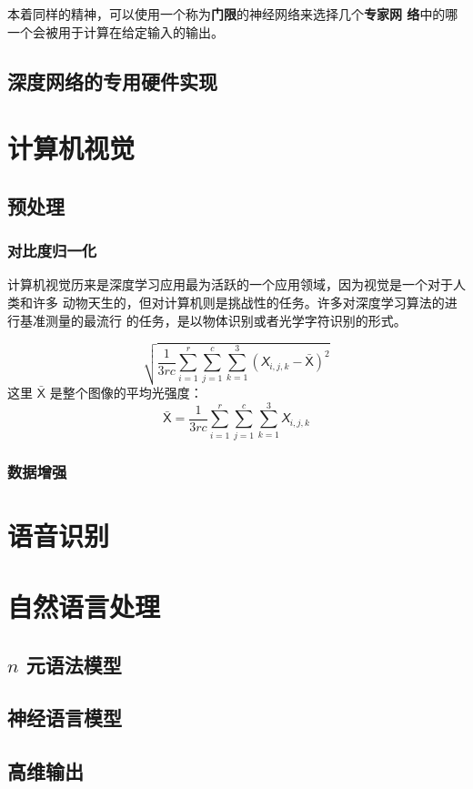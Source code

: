 本着同样的精神，可以使用一个称为\textbf{门限}的神经网络来选择几个\textbf{专家网
  络}中的哪一个会被用于计算在给定输入的输出。

\subsection{深度网络的专用硬件实现}
\label{subsec:specialized_hardware_implementations_of_deep_networks}

\section{计算机视觉}
\label{sec:computer_vision}

\subsection{预处理}
\label{subsec:preprocessing}

\subsubsection{对比度归一化}
\label{subsubsec:contrast_nomalization}

计算机视觉历来是深度学习应用最为活跃的一个应用领域，因为视觉是一个对于人类和许多
动物天生的，但对计算机则是挑战性的任务。许多对深度学习算法的进行基准测量的最流行
的任务，是以物体识别或者光学字符识别的形式。

\begin{equation}
\sqrt{\frac{1}{3rc}\displaystyle\sum_{i=1}^r\sum_{j=1}^c\sum_{k=1}^3(\mathsfit{X}_{i,j,k}
  - \bar{\pmb{\mathsf{X}}})^2}
\end{equation}
这里 $\bar{\pmb{\mathsf{X}}}$ 是整个图像的平均光强度：
\begin{equation}
  \bar{\pmb{\mathsf{X}}} = \frac{1}{3rc}\displaystyle\sum_{i=1}^r\sum_{j=1}^c\sum_{k=1}^3\mathsfit{X}_{i,j,k}
\end{equation}

\subsubsection{数据增强}
\label{subsubsec:dataset_augmentation}

\section{语音识别}
\label{sec:speech_recognition}

\section{自然语言处理}
\label{sec:natural_language_processing}

\subsection{$n$ 元语法模型}
\label{subsec:ngrams}

\subsection{神经语言模型}
\label{subsec:neural_language_models}

\subsection{高维输出}
\label{high_dimentional_outputs}

